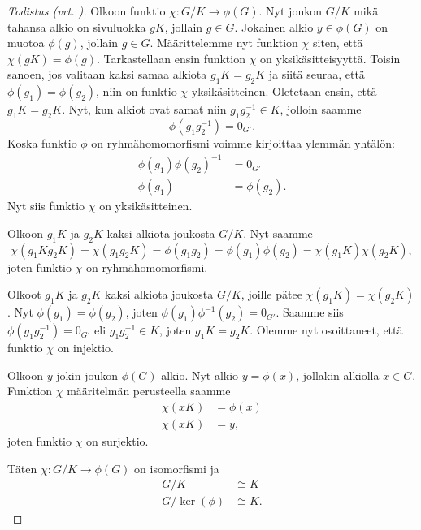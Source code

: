 \documentclass[a4paper,12pt,leqno,oneside]{report} %
\theoremstyle{plain}
\theoremstyle{plain}
\theoremstyle{definition}
\theoremstyle{remark}
\numberwithin{equation}{chapter}
\begin{document}
    \begin{proof}[Todistus \upshape(vrt. {\cite[s.~97]{PA}})]\label{tod:isomorfia}
        Olkoon funktio $\chi: G/K \rightarrow \phi(G)$. Nyt joukon $G/K$ mikä tahansa alkio on sivuluokka $gK$, jollain $g \in G$. Jokainen alkio $y \in \phi(G)$ on muotoa $\phi(g)$, jollain $g \in G$. Määrittelemme nyt funktion $\chi$ siten, että $\chi(gK) = \phi(g)$. Tarkastellaan ensin funktion $\chi$ on yksikäsitteisyyttä. Toisin sanoen, jos valitaan kaksi samaa alkiota $g_1K = g_2K$ ja siitä seuraa, että $\phi(g_1) = \phi(g_2)$, niin on funktio $\chi$ yksikäsitteinen.
        Oletetaan ensin, että $g_1K = g_2K$. Nyt, kun alkiot ovat samat niin $g_1g_2^{-1} \in K$, jolloin saamme
        \[
            \phi(g_1g_2^{-1}) = 0_{G'}.
        \]
        Koska funktio $\phi$ on ryhmähomomorfismi voimme kirjoittaa ylemmän yhtälön:
        \begin{align*}
            \phi(g_1){\phi(g_2)}^{-1} &= 0_{G'} \\
            \phi(g_1) &= \phi(g_2).
        \end{align*}
        Nyt siis funktio $\chi$ on yksikäsitteinen.

        Olkoon $g_1K$ ja $g_2K$ kaksi alkiota joukosta $G/K$. Nyt saamme
        \[
            \chi(g_1Kg_2K) = \chi(g_1g_2K) = \phi(g_1g_2) = \phi(g_1)\phi(g_2) = \chi(g_1K)\chi(g_2K),
        \]
        joten funktio $\chi$ on ryhmähomomorfismi.

        Olkoot $g_1K$ ja $g_2K$ kaksi alkiota joukosta $G/K$, joille pätee $\chi(g_1K) = \chi(g_2K)$.
        Nyt $\phi(g_1) = \phi(g_2)$, joten $\phi(g_1)\phi^{-1}(g_2) = 0_{G'}$. Saamme siis $\phi(g_1g_2^{-1}) = 0_{G'}$ eli $g_1g_2^{-1} \in K$, joten $g_1K = g_2K$. Olemme nyt osoittaneet, että funktio $\chi$ on injektio.

        Olkoon $y$ jokin joukon $\phi(G)$ alkio. Nyt alkio $y = \phi(x)$, jollakin alkiolla $x \in G$. Funktion $\chi$ määritelmän perusteella saamme 
        \begin{align*}
            \chi(xK) &= \phi(x) \\
            \chi(xK) &= y,
        \end{align*}
        joten funktio $\chi$ on surjektio.

        Täten $\chi: G/K \rightarrow \phi(G)$ on isomorfismi ja
        \begin{align*}
            G/K &\cong K \\
            G/\ker(\phi) &\cong K.
        \end{align*}
    \end{proof} 
\end{document}
